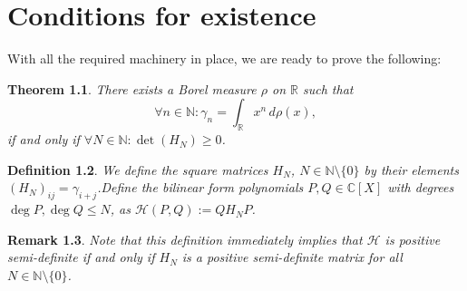 \documentclass[12pt,oneside]{report}
\newtheorem{thm}{Theorem}[chapter]
\newtheorem{defn}[thm]{Definition}
\newtheorem{rem}[thm]{Remark}
\begin{document}



\chapter{Conditions for existence}

With all the required machinery in place, we are ready to prove the following:

\begin{thm}\label{existence}
    There exists a Borel measure $\rho$ on $\mathbb{R}$ such that
    $$\forall n \in \mathbb{N}: \gamma_{n} = \int _{\mathbb{R}} x^{n} \, d\rho(x),$$
    if and only if $\forall N \in \mathbb{N}: \det(H_{N}) \geq 0$.
\end{thm}

\begin{defn}
    We define the square matrices $H_{N}$, $N \in \mathbb{N} \setminus \{ 0 \}$ by their elements $(H_{N})_{ij} = \gamma_{i+j}$.Define the bilinear form polynomials $P, Q \in \mathbb{C}[X]$ with degrees $\deg P, \deg Q \leq N$, as $\mathcal{H}(P,Q) := QH_{N}P$.
\end{defn}

\begin{rem}
    Note that this definition immediately implies that $\mathcal{H}$ is positive semi-definite if and only if $H_{N}$ is a positive semi-definite matrix for all $N \in \mathbb{N} \setminus \{ 0 \}$.
\end{rem}
\end{document}
